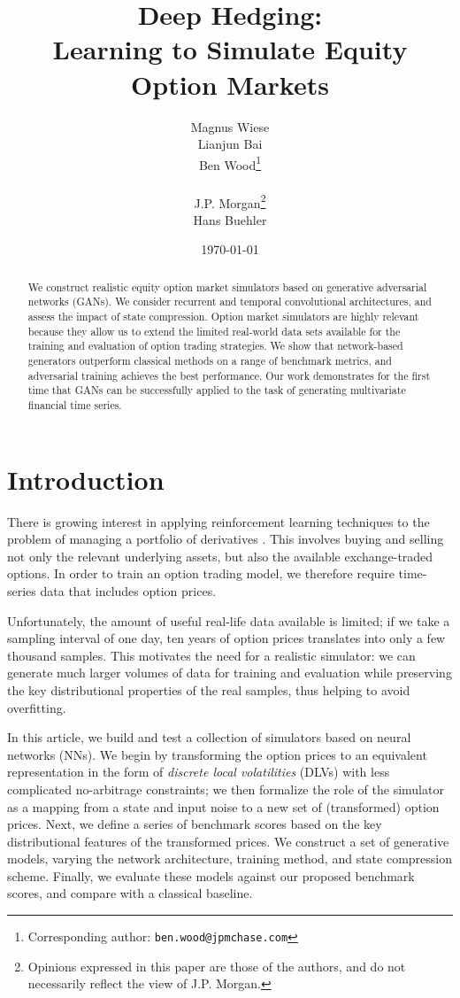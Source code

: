 \documentclass[]{article} %
\title{Deep Hedging: \\Learning to Simulate Equity Option Markets}
\author{%
  Magnus Wiese
  \\
  \And Lianjun Bai
  \\
  \And Ben Wood\thanks{Corresponding author: \texttt{ben.wood@jpmchase.com}}
  \\ %
  \vspace{0.5cm}
  \\ \hspace{-3.2cm} J.P. Morgan\thanks{Opinions expressed in this paper are those of the authors, and do not necessarily reflect the view of J.P. Morgan.}
  \\
  \And Hans Buehler
}
\date{\today}
\begin{document}
\maketitle
\begin{abstract}
We construct realistic equity option market simulators based on generative 
adversarial networks (GANs). We consider recurrent and temporal convolutional
architectures, and assess the impact of state compression.
Option market simulators are highly relevant because they allow us 
to extend the limited real-world data sets available for the training and evaluation of option 
trading strategies. 
We show that network-based generators outperform classical methods on a range of 
benchmark metrics, and adversarial training achieves the best performance. Our work demonstrates
for the first time that GANs can be successfully applied to the task of generating multivariate financial time series.
\end{abstract}

\section{Introduction}
There is growing interest in applying reinforcement learning techniques to the problem
of managing a portfolio of derivatives \cite{Buehler2019, Ritter2018}. This involves
buying and selling not only the relevant underlying assets, but also the available
exchange-traded options. In order to train an option trading model, we therefore require 
time-series data that includes option prices. 

Unfortunately, the amount of useful real-life data available is limited; if we
take a sampling interval of one day, ten years of option prices translates into 
only a few thousand samples. This motivates the need for a realistic simulator: we can 
generate much larger volumes of data for training and evaluation while preserving
the key distributional properties of the real samples, thus helping to avoid overfitting.

In this article, we build and test a collection of simulators based on neural networks (NNs).
We begin by transforming the option prices to an equivalent representation in the form of \emph{discrete local volatilities} (DLVs) \cite{Buehler2017, Wissel2007} with less 
complicated no-arbitrage constraints; we then formalize the role of the simulator as a 
mapping from a state and input noise to a new set of (transformed) option prices.
Next, we define a series of benchmark scores based on the key distributional features 
of the transformed prices. We construct a set of generative models, varying the 
network architecture, training method, and state compression scheme. 
Finally, we evaluate these models against our proposed benchmark scores, and 
compare with a classical baseline.
\end{document}
